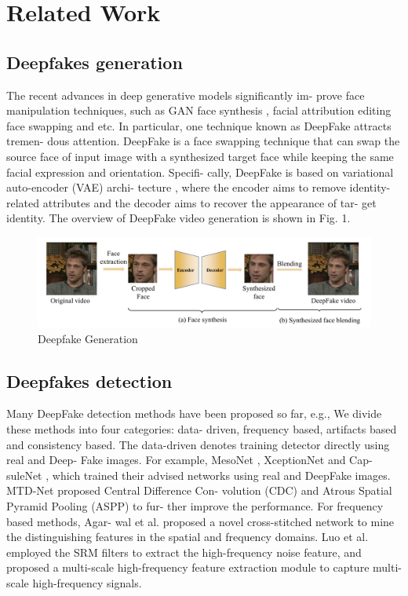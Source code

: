 


\section{Related Work}
\subsection{Deepfakes generation}
The recent advances in deep generative models significantly im-
prove face manipulation techniques, such as GAN face synthesis
, facial attribution editing face swapping  and etc.
In particular, one technique known as DeepFake attracts tremen-
dous attention. DeepFake is a face swapping technique that can
swap the source face of input image with a synthesized target face
while keeping the same facial expression and orientation. Specifi-
cally, DeepFake is based on variational auto-encoder (VAE) archi-
tecture , where the encoder aims to remove identity-related
attributes and the decoder aims to recover the appearance of tar-
get identity. The overview of DeepFake video generation is shown
in Fig. 1. 
\vspace{1cm}

\begin{figure}[h]
    \centering
    \includegraphics[width=1\textwidth]{figures/fig1.png}
    \caption{Deepfake Generation}
    \label{fig:enter-label}
\end{figure}


\subsection{Deepfakes detection}
Many DeepFake detection methods have been proposed so far,
e.g.,  We divide these methods into four categories: data-
driven, frequency based, artifacts based and consistency based. The
data-driven denotes training detector directly using real and Deep-
Fake images. For example, MesoNet , XceptionNet  and Cap-
suleNet , which trained their advised networks using real and DeepFake images. MTD-Net  proposed Central Difference Con-
volution (CDC) and Atrous Spatial Pyramid Pooling (ASPP) to fur-
ther improve the performance. For frequency based methods, Agar-
wal et al.  proposed a novel cross-stitched network to mine the
distinguishing features in the spatial and frequency domains. Luo
et al. employed the SRM filters to extract the high-frequency
noise feature, and proposed a multi-scale high-frequency feature
extraction module to capture multi-scale high-frequency signals.


